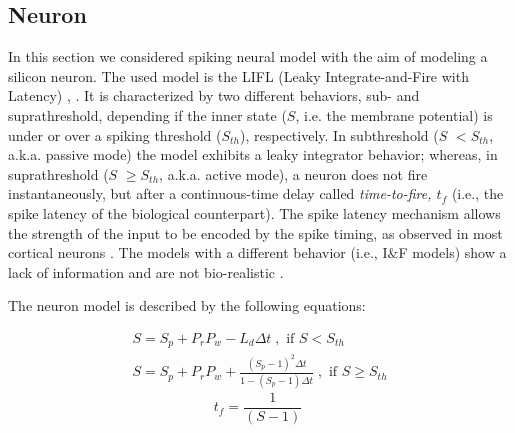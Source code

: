 \documentclass[review]{elsarticle}
\begin{document}
\subsection{Neuron} 
\label{neuro}

In this section we considered spiking neural model  with the aim of modeling a silicon neuron. The used model is the LIFL (Leaky Integrate-and-Fire with Latency) \cite{Cardarilli2013}, \cite{Cristini2015}. It is characterized by two different behaviors, sub- and suprathreshold, depending if the inner state ($S$, i.e. the membrane potential) is under or over a spiking threshold ($S_{th}$), respectively. In subthreshold ($S$ $< S_{th}$, a.k.a. passive mode) the model exhibits a leaky integrator behavior; whereas, in suprathreshold ($S$ $\ge S_{th}$,  a.k.a. active mode), a neuron does not fire instantaneously, but after a continuous-time delay called \emph{time-to-fire, $t_f$} (i.e., the spike latency of the biological counterpart). The spike latency mechanism allows the strength of the input to be encoded by the spike timing, as observed in most cortical neurons \cite{Izhikevich2004}. The models with a different behavior (i.e., I$\&$F models) show a lack of information and are not bio-realistic \cite{Izhikevich2007}.

The neuron model is described by the following  equations:

\begin{eqnarray}
S=S_p+P_rP_w-L_d \Delta t \; , \mbox{ if } S < S_{th}   \label{pm}
\\
S=S_p+P_rP_w+\frac{(S_{p}-1)^{2} \Delta t}{1-(S_{p}-1)\Delta t} \; , \mbox{ if } S \ge S_{th}\label{eq:am}
\end{eqnarray}
\label{eqtot}
\begin{equation}
t_f = \frac{1}{(S-1)} \; \label{eq:fe}
\end{equation}
\end{document}
